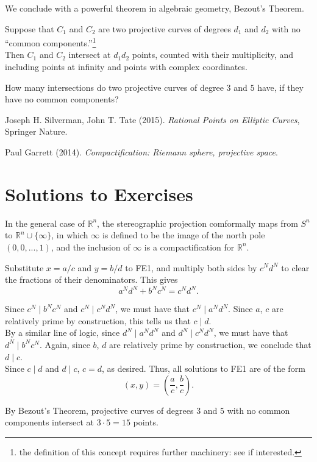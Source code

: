 \documentclass[11pt]{article}
\begin{document}
We conclude with a powerful theorem in algebraic geometry, Bezout's Theorem. \\

\begin{theorem} Suppose that $C_1$ and $C_2$ are two projective curves of degrees $d_1$ and $d_2$ with no ``common components.''\footnote{the definition of this concept requires further machinery: see \cite{silverman} if interested.} \\

Then $C_1$ and $C_2$ intersect at $d_1d_2$ points, counted with their multiplicity, and including points at infinity and points with complex coordinates.
\end{theorem}

\begin{exercise*}
How many intersections do two projective curves of degree $3$ and $5$ have, if they have no common components?   
\end{exercise*}


\begin{thebibliography}{9}
Joseph H. Silverman, John T. Tate (2015). \emph{Rational Points on Elliptic Curves}, Springer Nature.

Paul Garrett (2014). \emph{Compactification: Riemann sphere, projective space}.
\end{thebibliography}

\newpage

\section{Solutions to Exercises}

\begin{solution*} In the general case of $\mathbb{R}^n$, the stereographic projection comformally maps from $S^n$ to $\mathbb{R}^n\cup \{\infty\}$, in which $\infty$ is defined to be the image of the north pole $(0,0,...,1)$, and the inclusion of $\infty$ is a compactification for $\mathbb{R}^n$.
\end{solution*}

\begin{solution*}
Substitute $x = a/c$ and $y = b/d$ to FE1, and multiply both sides by $c^N d^N$ to clear the fractions of their denominators. This gives
\[ a^N d^N + b^N c^N = c^N d^N.\]

Since $c^N \mid b^N c^N$ and $c^N \mid c^N d^N$, we must have that $c^N \mid a^N d^N.$ Since $a$, $c$ are relatively prime by construction, this tells us that $c \mid d.$ \\

By a similar line of logic, since $d^N \mid a^N d^N$ and $d^N \mid c^N d^N$, we must have that $d^N \mid b^N c^N.$ Again, since $b$, $d$ are relatively prime by construction, we conclude that $d \mid c.$ \\

Since $c \mid d$ and $d \mid c$, $c = d$, as desired. Thus, all solutions to FE1 are of the form \[(x, y) = \left( \frac{a}{c}, \frac{b}{c} \right).\]\end{solution*}

\begin{solution*}
By Bezout's Theorem, projective curves of degrees $3$ and $5$ with no common components intersect at $3 \cdot 5 = 15$ points.
\end{solution*}
\end{document}
